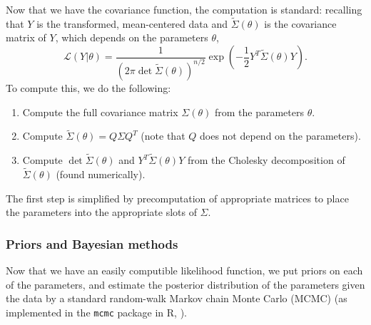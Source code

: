 \documentclass[12pt]{article}
\begin{document}
Now that we have the covariance function, the computation is standard:
recalling that $Y$ is the transformed, mean-centered data and $\widetilde \Sigma(\theta)$ is the covariance matrix of $Y$,
which depends on the parameters $\theta$,
\begin{equation} \label{eqn:likelihood}
    \mathcal{L}(Y|\theta) = \frac{ 1 }{ \left( 2 \pi \det{\widetilde \Sigma(\theta)} \right)^{n/2} } \exp \left( - \frac{1}{2} Y^T {\widetilde \Sigma(\theta)} Y \right) .
\end{equation}
To compute this, we do the following:
\begin{enumerate}
    \item Compute the full covariance matrix $\Sigma(\theta)$ from the parameters $\theta$.
    \item Compute $\widetilde \Sigma(\theta) = Q \Sigma Q^T$ (note that $Q$ does not depend on the parameters).
    \item Compute $\det{\widetilde \Sigma(\theta)}$ and $Y^T {\widetilde \Sigma(\theta)} Y$ from the Cholesky decomposition of $\widetilde \Sigma(\theta)$ (found numerically).
\end{enumerate}
The first step is simplified by precomputation of appropriate matrices to place the parameters into the appropriate slots of $\Sigma$.


\subsubsection*{Priors and Bayesian methods}

Now that we have an easily computible likelihood function,
we put priors on each of the parameters,
and estimate the posterior distribution of the parameters given the data
by a standard random-walk Markov chain Monte Carlo  (MCMC)
(as implemented in the \texttt{mcmc} package \citep{geyer2013mcmc} in R, \citet{R}).

\end{document}
